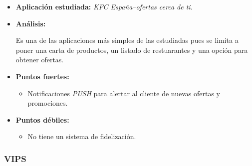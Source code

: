 \documentclass[twoside]{report}
\begin{document}
\begin{itemize}
\item \textbf{Aplicación estudiada:} \cite{kfcapp} \textit{KFC España–ofertas cerca de ti.}
\item \textbf{Análisis:} 

Es una de las aplicaciones más simples de las estudiadas pues se limita a poner una carta de productos, un listado de restuarantes y una opción para obtener ofertas.

\item \textbf{Puntos fuertes:}
	\begin{itemize}
	\item Notificaciones \textit{PUSH} para alertar al cliente de nuevas ofertas y promociones.
	\end{itemize}
\item \textbf{Puntos débiles:}
	\begin{itemize}
	\item No tiene un sistema de fidelización.
	\end{itemize}
\end{itemize}

\subsubsection{VIPS}
\end{document}
